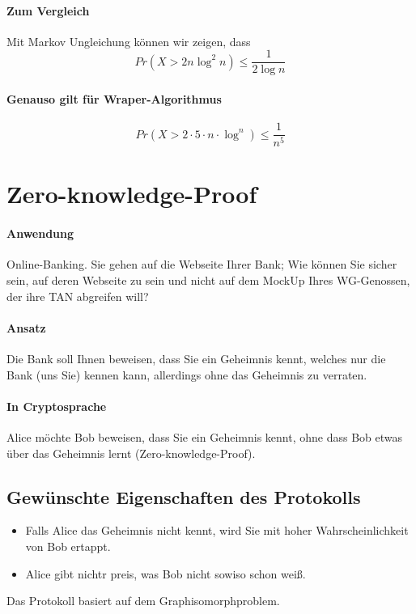 \paragraph*{Zum Vergleich} Mit Markov Ungleichung können wir zeigen, dass $$ Pr(X > 2n \log^2 n) \leq \frac{1}{2 \log n} $$

\paragraph*{Genauso gilt für Wraper-Algorithmus} $$ Pr(X > 2 \cdot 5 \cdot n \cdot \log^n) \leq \frac{1}{n^5} $$


\section{Zero-knowledge-Proof}
\paragraph*{Anwendung} Online-Banking. Sie gehen auf die Webseite Ihrer Bank; Wie können Sie sicher sein, auf deren Webseite zu sein und nicht auf dem MockUp Ihres WG-Genossen, der ihre TAN abgreifen will?

\paragraph*{Ansatz} Die Bank soll Ihnen beweisen, dass Sie ein Geheimnis kennt, welches nur die Bank (uns Sie) kennen kann, allerdings ohne das Geheimnis zu verraten.

\paragraph*{In Cryptosprache} Alice möchte Bob beweisen, dass Sie ein Geheimnis kennt, ohne dass Bob etwas über das Geheimnis lernt (Zero-knowledge-Proof).

\subsection{Gewünschte Eigenschaften des Protokolls}
\begin{itemize}
	\item Falls Alice das Geheimnis nicht kennt, wird Sie mit hoher Wahrscheinlichkeit von Bob ertappt.
	\item Alice gibt nichtr preis, was Bob nicht sowiso schon weiß.
\end{itemize}
Das Protokoll basiert auf dem Graphisomorphproblem.

